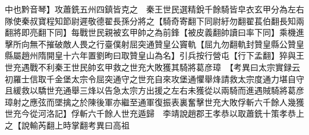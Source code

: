 中也黔音琴】攻蕭銑五州四鎮皆克之　秦王世民選精銳千餘騎皆皁衣玄甲分為左右隊使秦叔寶程知節尉遲敬德翟長孫分將之【騎奇寄翻下同尉紆勿翻翟萇伯翻長知兩翻將即亮翻下同】每戰世民親被玄甲帥之為前鋒【被皮義翻帥讀曰率下同】乘機進擊所向無不摧破敵人畏之行臺僕射屈突通贊皇公竇軌【屈九勿翻軌封贊皇縣公贊皇縣屬趙州隋開皇十六年置劉昫曰取贊皇山為名】引兵按行營屯【行下孟翻】猝與王世充遇戰不利秦王世民帥玄甲救之世充大敗獲其騎將葛彦璋　【考異曰太宗實録云初羅士信取千金堡太宗令屈突通守之世充自來攻堡通懼舉烽請救太宗度通力堪自守且緩救以驕世充通舉三烽以告急太宗方出援之左右未獲從以兩騎而進遇賊騎將葛彦璋射之應弦而墜擒之於陳後軍亦繼至通軍復振表裏奮擊世充大敗俘斬六千餘人幾獲世充今從河洛記】俘斬六千餘人世充遁歸　李靖說趙郡王孝恭以取蕭銑十策孝恭上之【說輸芮翻上時掌翻考異曰高祖
